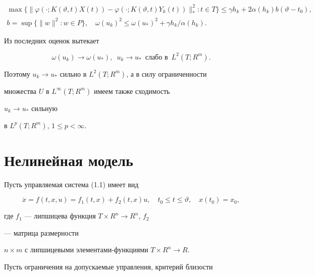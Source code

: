 \begin{pf}
\begin{gather*} 


\max\{\|\varphi(\cdot;K(\vartheta,t)X(t))- 


\varphi(\cdot;K(\vartheta,t)Y_k(t))\|^2_*:t\in T\}\le 


\gamma h_k+2\alpha(h_k)b(\vartheta-t_0),\\ 


b=\sup\{\|w\|^2:w\in P\},\quad 


\omega(u_k)^2\le\omega(u_*)^2+\gamma h_k/\alpha(h_k). 


\end{gather*} 


Из последних оценок вытекает


$$ 


\omega(u_k)\to\omega(u_*),\ \; u_k\to u_*\ \;\text{слабо в} 


\ \; L^2(T;R^m). 


$$ 


Поэтому $u_k\to u_*$ сильно в $L^2(T;R^m)$, а в силу ограниченности 


множества $U$ в $L^\infty(T;R^m)$ имеем также сходимость 


$u_k\to u_*$ сильную 


в $L^p(T;R^m)$, $1\le p<\infty$. 


\end{pf} 


 


\section{Нелинейная модель} 


 


Пусть управляемая система (1.1) имеет вид 


\begin{equation} 


\Dot x=f(t,x,u)=f_1(t,x)+f_2(t,x)u,\quad 


t_0\le t\le\vartheta,\quad x(t_0)=x_0, 


\end{equation} 


где $f_1$ --- липшицева функция $T\times R^n\to R^n$, $f_2$ 


--- матрица размерности 


$n\times m$ с липшицевыми элементами-функциями $T\times R^n\to R$. 


Пусть ограничения на допускаемые управления, критерий близости 


